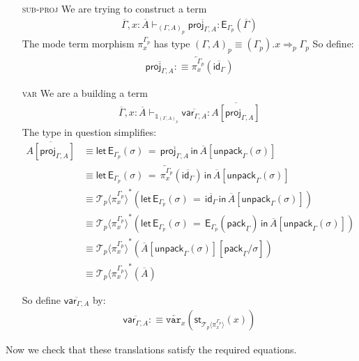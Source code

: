 \documentclass[10pt]{article}
\theoremstyle{definition}
\newcommand{\yields}{\vdash}
\newcommand{\tcell}{\Rightarrow}
\newcommand{\id}{\mathsf{id}}
\newcommand{\rewrite}[2]{\overleftarrow{#1}(#2)}
\newcommand\E[2]{\ensuremath{\mathsf{E}_{#1}(#2)}}
\newcommand\St[2]{\ensuremath{{#1}^*(#2)}}
\newcommand\StI[2]{\ensuremath{\mathsf{st}_{#1}(#2)}}
\newcommand\EEs[4]{\ensuremath{\mathsf{let} \, \mathsf{E}_{#1}(#3) \, = \, {#2} \, \mathsf{in} \, #4}}
\newcommand\EIs[2]{\ensuremath{\mathsf{E}_{#1}{(#2)}}}
\newcommand\ApEl[2]{\mathcal{T}_{#1}\langle#2\rangle}
\newcommand\pack[1]{\ensuremath{\mathsf{pack}_{#1}}}
\newcommand\unpack[2]{\ensuremath{\mathsf{unpack}_{#1}(#2)}}
\newcommand{\modeof}[1]{{#1}_p}
\newcommand{\upstairs}[1]{\overline{#1}}
\newcommand{\downstairs}[1]{\underline{#1}}
\newcommand\proj[1]{\ensuremath{\mathsf{proj}_{#1}}}
\newcommand\qvar[1]{\ensuremath{\mathsf{var}_{#1}}}
\newcommand\One{\ensuremath{\mathds{1}}}
\newcommand\var[1]{\ensuremath{\mathtt{var}_{#1}}}
\begin{document}
\begin{enumerate}
\item[\textsc{sub-proj}] We are trying to construct a term
\begin{align*}
\upstairs{\Gamma}, x : \upstairs{A} \yields_{\modeof{(\Gamma, A)}} \upstairs{\proj{\Gamma, A}} : \E{\modeof{\Gamma}}{\upstairs{\Gamma}}
\end{align*}
The mode term morphism $\pi^{\modeof{\Gamma}}_x$ has type $\modeof{(\Gamma, A)} \equiv (\modeof{\Gamma}).x \tcell_{p} \modeof{\Gamma}$
So define:
\begin{align*}
\upstairs{\proj{\Gamma, A}} :\equiv \rewrite{\pi^{\modeof{\Gamma}}_x}{\upstairs{\id_\Gamma}}
\end{align*}

\item[\textsc{var}] We are a building a term
\begin{align*}
\upstairs{\Gamma}, x : \upstairs{A} \yields_{\One_{\modeof{(\Gamma, A)}}} \upstairs{\qvar{\Gamma, A}} : \upstairs{A[\proj{\Gamma, A}]}
\end{align*}
The type in question simplifies:
\begin{align*}
\upstairs{A[\proj{\Gamma, A}]}
&\equiv \EEs{\modeof{\Gamma}}{\upstairs{\proj{\Gamma, A}}}{\sigma}{\upstairs{A}[\unpack{\Gamma}{\sigma}]} \\
&\equiv \EEs{\modeof{\Gamma}}{\rewrite{\pi^{\modeof{\Gamma}}_x}{\upstairs{\id_\Gamma}}}{\sigma}{\upstairs{A}[\unpack{\Gamma}{\sigma}]} \\
&\equiv \St{\ApEl{p}{\pi^{\modeof{\Gamma}}_x}}{\EEs{\modeof{\Gamma}}{\upstairs{\id_\Gamma}}{\sigma}{\upstairs{A}[\unpack{\Gamma}{\sigma}]}} \\
&\equiv \St{\ApEl{p}{\pi^{\modeof{\Gamma}}_x}}{\EEs{\modeof{\Gamma}}{\EIs{\modeof{\Gamma}}{\pack{\downstairs{\Gamma}}}}{\sigma}{\upstairs{A}[\unpack{\Gamma}{\sigma}]}} \\
&\equiv \St{\ApEl{p}{\pi^{\modeof{\Gamma}}_x}}{\upstairs{A}[\unpack{\Gamma}{\sigma}][\pack{\downstairs{\Gamma}}/\sigma]} \\
&\equiv \St{\ApEl{p}{\pi^{\modeof{\Gamma}}_x}}{\upstairs{A}}
\end{align*}

So define $\upstairs{\qvar{\Gamma, A}}$ by:
\begin{align*}
\upstairs{\qvar{\Gamma, A}} :\equiv \rewrite{\var{x}}{\StI{\ApEl{p}{\pi^{\modeof{\Gamma}}_x}}{x}}
\end{align*}
\end{enumerate}

Now we check that these translations satisfy the required equations.
\end{document}

